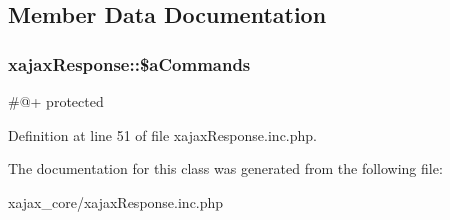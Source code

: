 \subsection{Member Data Documentation}
\hypertarget{classxajaxResponse_a0ada3803cf2660ff9ffac0d578a4bf7c}{
\subsubsection[{\$aCommands}]{\setlength{\rightskip}{0pt plus 5cm}xajaxResponse::\$aCommands}}
\label{classxajaxResponse_a0ada3803cf2660ff9ffac0d578a4bf7c}
\#@+  protected 

Definition at line 51 of file xajaxResponse.inc.php.



The documentation for this class was generated from the following file:\begin{DoxyCompactItemize}
\item 
xajax\_\-core/xajaxResponse.inc.php\end{DoxyCompactItemize}
